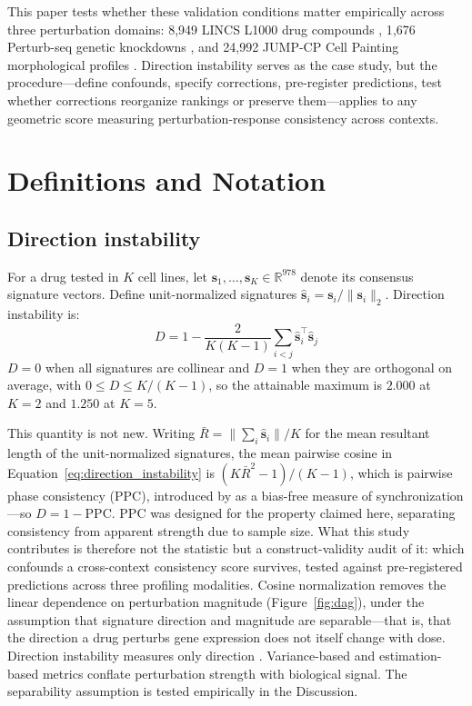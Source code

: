 \documentclass[11pt]{article}
\begin{document}
This paper tests whether these validation conditions matter empirically
across three perturbation domains: 8{,}949 LINCS L1000 drug compounds
\citep{subramanian2017next}, 1{,}676 Perturb-seq genetic knockdowns
\citep{replogle2022mapping}, and 24{,}992 JUMP-CP Cell Painting morphological
profiles \citep{chandrasekaran2023jump}. Direction instability serves as
the case study, but the procedure---define confounds, specify corrections,
pre-register predictions, test whether corrections reorganize rankings or
preserve them---applies to any geometric score measuring
perturbation-response consistency across contexts.

\section{Definitions and Notation}

\subsection{Direction instability}

For a drug tested in $K$ cell lines, let $\mathbf{s}_1, \ldots,
\mathbf{s}_K \in \mathbb{R}^{978}$ denote its consensus signature vectors.
Define unit-normalized signatures $\hat{\mathbf{s}}_i = \mathbf{s}_i /
\|\mathbf{s}_i\|_2$. Direction instability is:
\begin{equation}
  D = 1 - \frac{2}{K(K-1)} \sum_{i < j}
    \hat{\mathbf{s}}_i^\top \hat{\mathbf{s}}_j
  \label{eq:direction_instability}
\end{equation}
$D = 0$ when all signatures are collinear and $D = 1$ when they are
orthogonal on average, with $0 \leq D \leq K/(K-1)$, so the attainable
maximum is $2.000$ at $K = 2$ and $1.250$ at $K = 5$.

This quantity is not new. Writing $\bar{R} = \|\sum_i
\hat{\mathbf{s}}_i\|/K$ for the mean resultant length of the
unit-normalized signatures, the mean pairwise cosine in
Equation~\ref{eq:direction_instability} is $(K\bar{R}^2 - 1)/(K-1)$, which
is pairwise phase consistency (PPC), introduced by \citet{vinck2010ppc} as
a bias-free measure of synchronization---so $D = 1 - \mathrm{PPC}$. PPC was
designed for the property claimed here, separating consistency from
apparent strength due to sample size. What this study contributes is
therefore not the statistic but a construct-validity audit of it: which
confounds a cross-context consistency score survives, tested against
pre-registered predictions across three profiling modalities.
Cosine normalization removes the linear dependence on perturbation
magnitude (Figure~\ref{fig:dag}), under the assumption that signature
direction and magnitude are separable---that is, that the direction a
drug perturbs gene expression does not itself change with dose.
Direction instability measures only direction \citep{tower2026drug}.
Variance-based and estimation-based metrics conflate perturbation
strength with biological signal. The separability assumption is tested
empirically in the Discussion.
\end{document}
